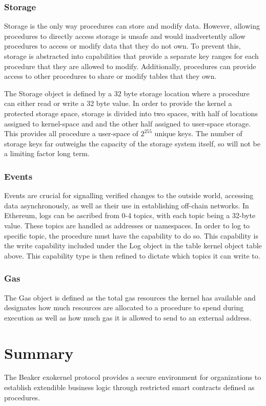 \documentclass[english,a4paper]{article}
\let\oldparagraph\subsubsection
\renewcommand{\subsubsection}[1]{\oldparagraph{#1}\mbox{}}
\begin{document}
\subsubsection{Storage}\label{storage}
Storage is the only way procedures can store and modify data. However,
allowing procedures to directly access storage is unsafe and would
inadvertently allow procedures to access or modify data that they do not
own. To prevent this, storage is abstracted into capabilities that
provide a separate key ranges for each procedure that they are allowed
to modify. Additionally, procedures can provide access to other
procedures to share or modify tables that they own.

The Storage object is defined by a 32 byte storage location where a
procedure can either read or write a 32 byte value. In order to provide
the kernel a protected storage space, storage is divided into two
spaces, with half of locations assigned to kernel-space and and the
other half assigned to user-space storage. This provides all procedure a
user-space of $2^{255}$ unique keys. The number of storage keys far outweighs
the capacity of the storage system itself, so will not be a limiting
factor long term.

\subsubsection{Events}\label{events}
Events are crucial for signalling verified changes to the outside world,
accessing data asynchronously, as well as their use in establishing
off-chain networks. In Ethereum, logs can be ascribed from 0-4 topics,
with each topic being a 32-byte value. These topics are handled as
addresses or namespaces. In order to log to specific topic, the
procedure must have the capability to do so. This capability is the
write capability included under the Log object in the table kernel
object table above. This capability type is then refined to dictate
which topics it can write to.

\subsubsection{Gas}\label{gas}
The Gas object is defined as the total gas resources the kernel has
available and designates how much resources are allocated to a procedure
to spend during execution as well as how much gas it is allowed to send
to an external address.

\section{Summary}\label{summary}
The Beaker exokernel protocol provides a secure environment for
organizations to establish extendible business logic through restricted
smart contracts defined as procedures.
\end{document}
